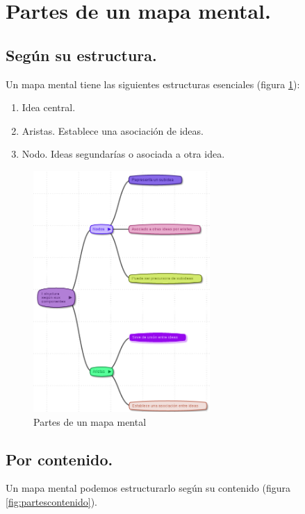 \section{Partes de un mapa mental.}

\subsection{Según su estructura.}
Un mapa mental tiene las siguientes estructuras esenciales (figura \ref{fig:partesestructura}):

\begin{enumerate}
\item Idea central.
\item Aristas. Establece una asociación de ideas.
\item Nodo. Ideas segundarías o asociada a otra idea.
\end{enumerate}

\begin{figure}[htbp]
\centering
\includegraphics[width=0.6\textwidth]{imagenes/Estructura2.png}
\caption{Partes de un mapa mental}
\label{fig:partesestructura}
\end{figure}

\subsection{Por contenido.}

Un mapa mental podemos estructurarlo según su contenido (figura \ref{fig:partescontenido}).

